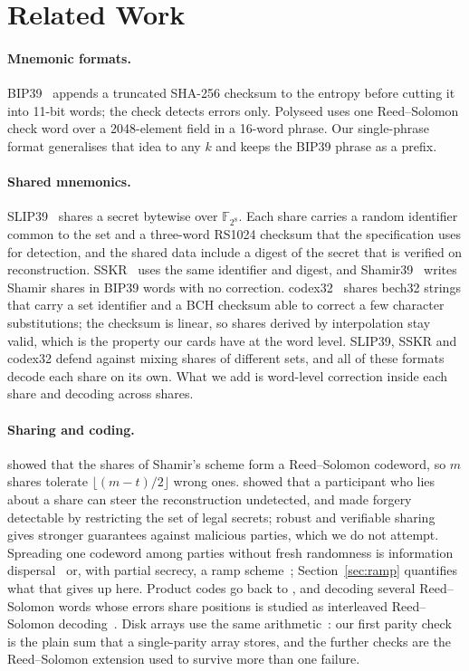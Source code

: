 \documentclass[numeric]{anvil-paper}
\newcommand{\F}{\mathbb{F}}
\begin{document}
\section{Related Work}
\label{sec:related}

\paragraph{Mnemonic formats.}
BIP39~\citep{bip39} appends a truncated SHA-256 checksum to the entropy before
cutting it into 11-bit words; the check detects errors only. Polyseed
\citep{polyseed} uses one Reed--Solomon check word over a 2048-element field in
a 16-word phrase. Our single-phrase format generalises that idea to any $k$ and
keeps the BIP39 phrase as a prefix.

\paragraph{Shared mnemonics.}
SLIP39~\citep{slip39} shares a secret bytewise over $\F_{2^8}$. Each share
carries a random identifier common to the set and a three-word RS1024 checksum
that the specification uses for detection, and the shared data include a
digest of the secret that is verified on reconstruction. SSKR~\citep{sskr}
uses the same identifier and digest, and Shamir39~\citep{shamir39} writes
Shamir shares in BIP39 words with no correction. codex32~\citep{bip93} shares bech32 strings that carry
a set identifier and a BCH checksum able to correct a few character
substitutions; the checksum is linear, so shares derived by interpolation stay
valid, which is the property our cards have at the word level. SLIP39, SSKR and codex32
defend against mixing shares of different sets, and all of these formats
decode each share on its own. What we add is word-level correction inside each share and
decoding across shares.

\paragraph{Sharing and coding.}
\citet{mceliece1981sharing} showed that the shares of Shamir's scheme form a
Reed--Solomon codeword, so $m$ shares tolerate $\lfloor (m-t)/2\rfloor$ wrong
ones. \citet{tompa1989how} showed that a participant who lies about a share can
steer the reconstruction undetected, and made forgery detectable by
restricting the set of legal secrets; robust and verifiable sharing
\citep{rabin1989verifiable} gives stronger guarantees against malicious
parties, which we do not attempt. Spreading one codeword among parties without
fresh randomness is information dispersal~\citep{rabin1989efficient} or, with
partial secrecy, a ramp scheme~\citep{blakley1985security,
franklin1992communication}; Section~\ref{sec:ramp} quantifies what that gives
up here. Product codes go back to \citet{elias1954error}, and decoding several
Reed--Solomon words whose errors share positions is studied as interleaved
Reed--Solomon decoding~\citep{schmidt2009collaborative}. Disk arrays use the
same arithmetic~\citep{patterson1988case, plank1997tutorial}: our first
parity check is the plain sum that a single-parity array stores, and the
further checks are the Reed--Solomon extension used to survive more than one
failure.
\end{document}
